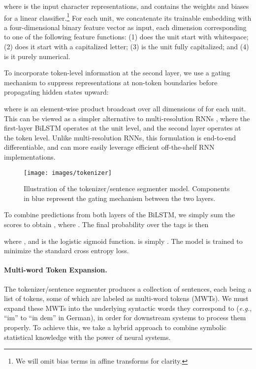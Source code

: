 \documentclass[11pt,a4paper]{article}
\begin{document}
where  is the input character representations, and  contains the weights and biases for a linear classifier.\footnote{We will omit bias terms in affine transforms for clarity.}
For each unit, we concatenate its trainable embedding with a four-dimensional binary feature vector as input, each dimension corresponding to one of the following feature functions: (1) does the unit start with whitespace; (2) does it start with a capitalized letter; (3) is the unit fully capitalized; and (4) is it purely numerical.

To incorporate token-level information at the second layer, we use a gating mechanism to suppress representations at non-token boundaries before propagating hidden states upward:

where  is an element-wise product broadcast over all dimensions of  for each unit. This can be viewed as a simpler alternative to multi-resolution RNNs \cite{serban2017multiresolution}, where the first-layer BiLSTM operates at the unit level, and the second layer operates at the token level. Unlike multi-resolution RNNs, this formulation is end-to-end differentiable, and can more easily leverage efficient off-the-shelf RNN implementations.

\begin{figure}
  \centering
  \texttt{[image: images/tokenizer]}
  \vspace{-1em}
  \caption{Illustration of the tokenizer\slash{}sentence segmenter model. Components in blue represent the gating mechanism between the two layers.} \label{fig:tokenizer}
\end{figure}

To combine predictions from both layers of the BiLSTM, we simply sum the scores to obtain ,
where .
The final probability over the tags is then

where , and  is the logistic sigmoid function.
 is simply .
The model is trained to minimize the standard cross entropy loss.

\paragraph{Multi-word Token Expansion.} The tokenizer\slash{}sentence segmenter produces a collection of sentences, each being a list of tokens, some of which are labeled as multi-word tokens (MWTs).
We must expand these MWTs into the underlying syntactic words they correspond to (\emph{e.g.}, ``im'' to ``in dem'' in German), in order for downstream systems to process them properly.
To achieve this, we take a hybrid approach to combine symbolic statistical knowledge with the power of neural systems.
\end{document}
